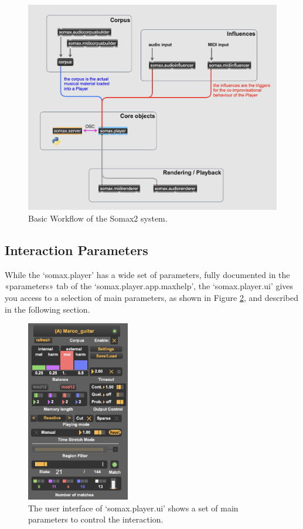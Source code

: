  \begin{figure}[h!]
    \centering        
 	\includegraphics[width=1\textwidth, keepaspectratio]{img/somax_workflow.png}
    \caption{Basic Workflow of the Somax2 system.}
    \label{fig:workflow}
\end{figure}


\subsection{Interaction Parameters}\label{sec:parameters}

While the `somax.player' has a wide set of parameters, fully documented in the «parameters» tab of the `somax.player.app.maxhelp', the `somax.player.ui' gives you access to a selection of main parameters, as shown in Figure \ref{fig:player_ui}, and described in the following section. 

 \begin{figure}[h]
    \centering        
 	\includegraphics[width=0.4\textwidth]{img/player_ui.png}
    \caption{The user interface of `somax.player.ui' shows a set of main parameters to control the interaction.}
    \label{fig:player_ui}
\end{figure}

